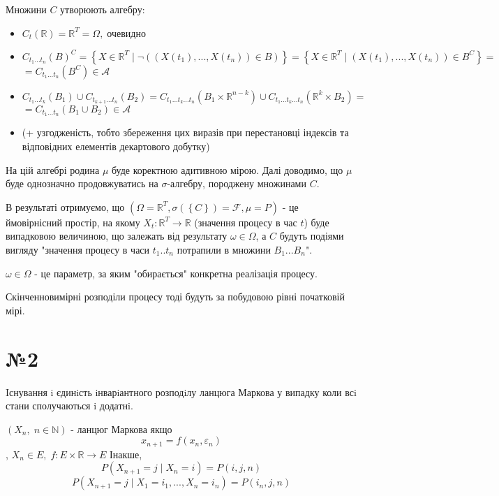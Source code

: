 \documentclass[11pt, a4paper]{article} %
\begin{document}
Множини $C$ утворюють алгебру:
\begin{itemize}
    \item 
    \(C_t(\mathbb R) = \mathbb{R}^T = \Omega,\; \text{очевидно}\)
    \item
    \(C_{t_1...t_n}(B)^C = \left\{X \in \mathbb{R}^T \;|\; \neg \left( (X(t_1), ..., X(t_n)) \in B\right)\right\} = \left\{X \in \mathbb{R}^T \;|\; (X(t_1), ..., X(t_n)) \in B^C\right\} =\) \\
    \(= C_{t_1...t_n}(B^C) \in \mathcal A\)
    \item
    \(C_{t_1...t_k}(B_1) \cup C_{t_{k+1}...t_n}(B_2) = C_{t_1...t_k...t_n}(B_1 \times \mathbb R^{n-k})\cup C_{t_1...t_k...t_n}(\mathbb R^k \times B_2) = \) \\
    \(= C_{t_1...t_n}(B_1 \cup B_2) \in \mathcal A\)
    \item (+ узгодженість, тобто збереження цих виразів при перестановці індексів 
    та відповідних елементів декартового добутку)
\end{itemize}


На цій алгебрі родина $\mu$ буде коректною адитивною мірою.
Далі доводимо, що $\mu$ буде однозначно продовжуватись на $\sigma$-алгебру, породжену множинами $C$.

В результаті отримуємо, що $\left(\Omega=\mathbb{R}^T, \sigma(\left\{C\right\})=\mathcal F, \mu = P\right)$ - це ймовірнісний простір, 
на якому $X_t : \mathbb{R}^T \to \mathbb R$ (значення процесу в час $t$) буде випадковою величиною, що залежать від результату $\omega \in \Omega$, 
а $C$ будуть подіями вигляду "значення процесу в часи $t_1..t_n$ потрапили в множини $B_1...B_n$". 

$\omega \in \Omega$ - це параметр, за яким "обирається" конкретна реалізація процесу.

Скінченновимірні розподіли процесу тоді будуть за побудовою рівні початковій мірі.


\section*{№2}
\begin{mdframed}
    Iснування i єдинiсть iнварiантного розподiлу ланцюга Маркова у випадку коли всi стани
сполучаються i додатнi.
\end{mdframed}

$(X_n, \; n\in \mathbb N)$ - ланцюг Маркова якщо
\[x_{n+1} = f(x_n, \varepsilon_n)\]
, $X_n \in E, \; f : E\times\mathbb R \to E$
Інакше, 
\[P(X_{n+1} = j \;|\; X_{n} = i) = P(i,j,n)\]
\[P(X_{n+1} = j \;|\; X_{1} = i_1, ..., X_{n} = i_n) = P(i_n,j,n)\]
\end{document}
